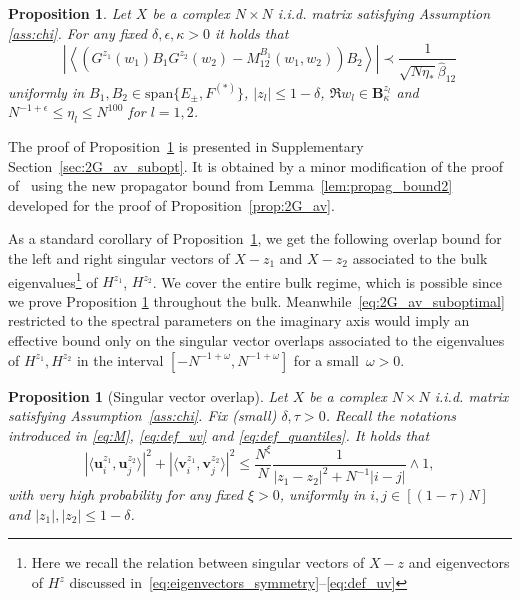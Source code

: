 \documentclass[10pt]{amsart}
\newtheorem{proposition}[theorem]{Proposition}
\numberwithin{equation}{section}
\begin{document}
\begin{proposition}\label{prop:2G_av_suboptimal} Let $X$ be a complex $N\times N$ i.i.d. matrix satisfying Assumption \ref{ass:chi}. For any fixed $\delta,\epsilon,\kappa>0$ it holds that
\begin{equation}
\left\vert \left\langle \left(G^{z_1}(w_1)B_1G^{z_2}(w_2)-M_{12}^{B_1}(w_1,w_2)\right)B_2\right\rangle\right\vert \prec \frac{1}{\sqrt{N\eta_*}\widehat{\beta}_{12}}
\label{eq:2G_av_suboptimal}
\end{equation}  
uniformly in $B_1,B_2\in\mathrm{span}\{E_\pm,F^{(*)}\}$, $|z_l|\le 1-\delta$, $\Re w_l\in\mathbf{B}_\kappa^{z_l}$ and $N^{-1+\epsilon}\le \eta_l\le N^{100}$ for $l=1,2$.
\end{proposition}

The proof of Proposition~\ref{prop:2G_av_suboptimal} is presented in Supplementary Section~\ref{sec:2G_av_subopt}. It is obtained by a minor modification of the proof of~\cite[Theorem~3.4]{nonHermdecay} using the new propagator bound from Lemma~\ref{lem:propag_bound2} developed for the proof of Proposition~\ref{prop:2G_av}.

As a standard corollary of Proposition~\ref{prop:2G_av_suboptimal}, we get the following overlap bound for the left and right singular vectors of $X-z_1$ and $X-z_2$ associated to the bulk eigenvalues\footnote{Here we recall the relation between singular vectors of $X-z$ and eigenvectors of $H^z$ discussed in~\eqref{eq:eigenvectors_symmetry}--\eqref{eq:def_uv}} of $H^{z_1}$, $H^{z_2}$. We cover the entire bulk regime, which is possible since we prove Proposition \ref{prop:2G_av_suboptimal} throughout the bulk. Meanwhile~\eqref{eq:2G_av_suboptimal} restricted to the spectral parameters on the imaginary axis would imply an effective bound only on the singular vector overlaps associated to the eigenvalues of $H^{z_1}, H^{z_2}$ in the interval $[-N^{-1+\omega}, N^{-1+\omega}]$ for a small~$\omega>0$.

\begin{proposition}[Singular vector overlap]\label{prop:overlap} Let $X$ be a complex $N\times N$ i.i.d. matrix satisfying Assumption~\ref{ass:chi}. Fix (small) $\delta, \tau>0$. Recall the notations introduced in \eqref{eq:M}, \eqref{eq:def_uv} and \eqref{eq:def_quantiles}. It holds that
\begin{equation}
\left\vert \langle \bm{u}_i^{z_1},\bm{u}_j^{z_2}\rangle\right\vert^2 + \left\vert \langle \bm{v}_i^{z_1},\bm{v}_j^{z_2}\rangle\right\vert^2 \le \frac{N^\xi}{N}\frac{1}{|z_1-z_2|^2+N^{-1}|i-j|}\wedge 1,
\label{eq:overlap_bound}
\end{equation}
with very high probability for any fixed $\xi>0$, uniformly in $i,j\in [(1-\tau)N]$ and $|z_1|,|z_2|\le 1-\delta$.
\end{proposition}
\end{document}
